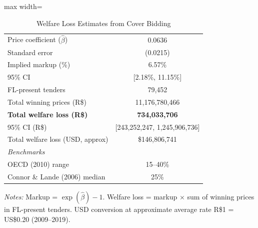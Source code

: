 \begin{table}[htbp]
\centering
\caption{Welfare Loss Estimates from Cover Bidding}
\label{tab:welfare}
\begin{adjustbox}{max width=\textwidth}
\begin{threeparttable}
\small
\begin{tabular}{lc}
\toprule
\midrule
Price coefficient ($\hat{\beta}$) & 0.0636 \\
Standard error & (0.0215) \\
Implied markup (\%) & 6.57\% \\
95\% CI & [2.18\%, 11.15\%] \\
\midrule
FL-present tenders & 79,452 \\
Total winning prices (R\$) & 11,176,780,466 \\
\midrule
\textbf{Total welfare loss (R\$)} & \textbf{734,033,706} \\
95\% CI (R\$) & [243,252,247, 1,245,906,736] \\
Total welfare loss (USD, approx) & \$146,806,741 \\
\midrule
\textit{Benchmarks} & \\
OECD (2010) range & 15--40\% \\
Connor \& Lande (2006) median & 25\% \\
\bottomrule
\end{tabular}
\begin{tablenotes}
\small
\item \textit{Notes:} Markup = $\exp(\hat{\beta}) - 1$.
Welfare loss = markup $\times$ sum of winning prices in FL-present tenders.
USD conversion at approximate average rate R\$1 = US\$0.20 (2009--2019).
\end{tablenotes}
\end{threeparttable}
\end{adjustbox}
\end{table}
